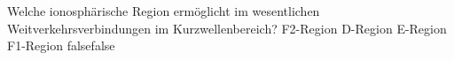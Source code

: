     {Welche ionosphärische Region ermöglicht im wesentlichen Weitverkehrsverbindungen im Kurzwellenbereich?}
    {F2-Region}
    {D-Region}
    {E-Region}
    {F1-Region}
    {false}{false}